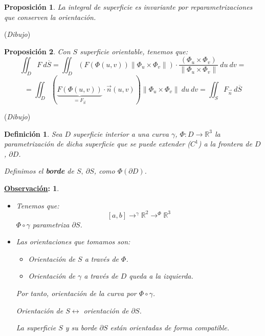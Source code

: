 \documentclass[10pt,a4paper,openright]{book}
\theoremstyle{break}
\newtheorem*{defi}{Definición}
\newtheorem*{prop}{Proposición}
\newtheorem*{obs}{\underline{Observación}:}
\newcommand{\dif}[1]{\ d#1}
\begin{document}
\begin{prop}
La integral de superficie es invariante por reparametrizaciones que conserven la orientación.
\end{prop}
(\textit{Dibujo})

\begin{prop}
Con $S$ superficie orientable, tenemos que: 
$$\iint_{D} F \dif{\overline{S}} = \iint_{D} \left( F\left( \Phi \left( u, v \right) \right) \lVert \Phi_u \times \Phi_v \rVert \right) \cdot \frac{\left( \Phi_u \times \Phi_v \right)}{\lVert \Phi_u \times \Phi_v \rVert} \dif{u} \dif{v} =$$
$$= \iint_{D} \left( \underbrace{F\left( \Phi\left( u, v \right) \right)}_{= F_{\vec{n}}} \cdot \vec{n} \left( u, v \right) \right) \lVert \Phi_u \times \Phi_v \rVert \dif{u} \dif{v} = \iint_{S} F_{\vec{n}} \dif{\overline{S}}$$
\end{prop}

(\textit{Dibujo})

\begin{defi}
Sea $D$ superficie interior a una curva $\gamma$, $\Phi: D \rightarrow \mathbb{R}^3$ la parametrización de dicha superficie que se puede extender ($C^1$) a la frontera de $D$, $\partial D$. 

Definimos el \textbf{borde} de $S,\ \partial S$, como $\Phi\left( \partial D \right)$.
\end{defi}
\begin{obs}
\begin{itemize}
    \item Tenemos que: 
    $$\left[ a, b \right] \rightarrow^{\gamma} \mathbb{R}^2 \rightarrow^{\Phi} \mathbb{R}^3$$
    $\Phi \circ \gamma$ parametriza $\partial S$.

    \item Las orientaciones que tomamos son: 
    \begin{itemize}
        \item Orientación de $S$ a través de $\Phi$. 
        \item Orientación de $\gamma$ a través de $D$ queda a la izquierda.
    \end{itemize}
    Por tanto, orientación de la curva por $\Phi \circ \gamma$. 

    Orientación de $S \leftrightarrow$ orientación de $\partial S$.

    La superficie $S$ y su borde $\partial S$ están orientadas de forma compatible.
\end{itemize}
\end{obs}
\end{document}
